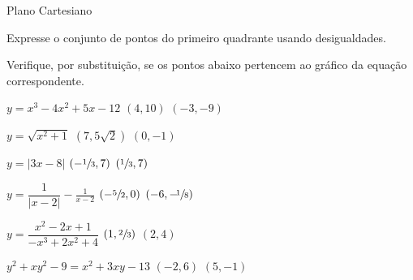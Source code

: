 \begin{exercicios}{Plano Cartesiano}
    \begin{exercicio}
        Expresse o conjunto de pontos do primeiro quadrante usando desigualdades.
    \end{exercicio}

    \begin{exercicio}
        Verifique, por substituição, se os pontos abaixo pertencem ao gráfico da equação correspondente.
	    \begin{alphalist}
	    	\item \( y = x^3 - 4x^2 + 5x - 12 \)           \tabto{46mm} $(4,10)$                        \tabto{60mm} $(-3,-9)$
	    	\item \( y = \sqrt{x^2 + 1} \)                 \tabto{46mm} $(7,5\sqrt{2})$                 \tabto{60mm} $(0,-1)$
	    	\item \( y = |3x - 8| \)                       \tabto{46mm} $\left(-\sfrac{1}{3},7\right)$  \tabto{60mm} $\left(\sfrac{1}{3}, 7\right)$
	    	\item \( y = \dfrac{1}{|x-2|}-\frac{1}{x-2} \) \tabto{46mm} $\left(-\sfrac{5}{2},0\right)$  \tabto{60mm} $\left(-6,-\!\sfrac{1}{8}\right)$
	    	\item \( y = \dfrac{x^2-2x+1}{-x^3+2x^2+4} \)  \tabto{46mm} $\left(1,\sfrac{2}{3}\right)$   \tabto{60mm} $(2, 4)$
	    	\item \( y^2 + xy^2 - 9 = x^2 + 3xy - 13 \)    \tabto{46mm} $(-2, 6)$                       \tabto{60mm} $(5,-1)$
	    \end{alphalist} 
    \end{exercicio}
    

\end{exercicios}
